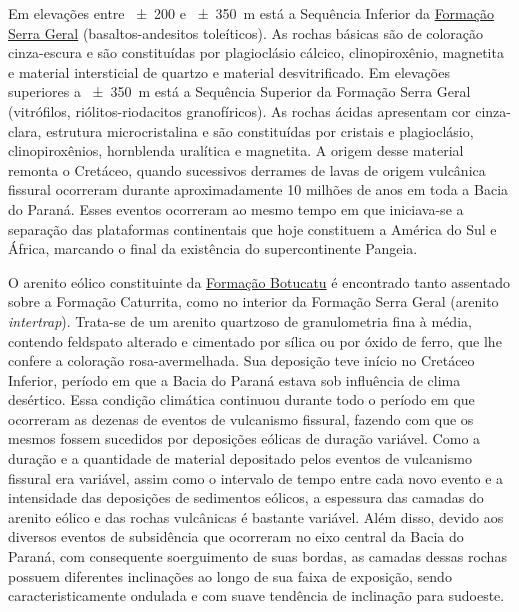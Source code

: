 \def\serrageral{\href{http://pt.wikipedia.org/wiki/Forma\%C3\%A7\%C3\%A3o_Serra_Geral}{Formação Serra Geral}}

Em elevações entre \num{\pm200} e \SI{\pm350}{\metre} está a Sequência Inferior da \serrageral{} 
(basaltos-andesitos toleíticos). As rochas básicas são de coloração cinza-escura e são constituídas por 
plagioclásio cálcico, clinopiroxênio, magnetita e material intersticial de quartzo e material desvitrificado. 
Em elevações superiores a \SI{\pm350}{\metre} está a Sequência Superior da Formação Serra Geral (vitrófilos, 
riólitos-riodacitos granofíricos). As rochas ácidas apresentam cor cinza-clara, estrutura microcristalina e 
são constituídas por cristais e plagioclásio, clinopiroxênios, hornblenda uralítica e magnetita. A origem 
desse material remonta o Cretáceo, quando sucessivos derrames de lavas de origem vulcânica fissural ocorreram 
durante aproximadamente \num{10} milhões de anos em toda a Bacia do Paraná. Esses eventos ocorreram ao mesmo 
tempo em que iniciava-se a separação das plataformas continentais que hoje constituem a América do Sul e 
África, 
marcando o final da existência do supercontinente Pangeia.

\def\botucatu{\href{http://pt.wikipedia.org/wiki/Forma\%C3\%A7\%C3\%A3o_Botucatu}{Formação Botucatu}}

O arenito eólico constituinte da \botucatu{} é encontrado tanto assentado sobre a Formação Caturrita, como no 
interior da Formação Serra Geral (arenito \emph{intertrap}). Trata-se de um arenito quartzoso de granulometria 
fina à média, contendo feldspato alterado e cimentado por sílica ou por óxido de ferro, que lhe confere a 
coloração rosa-avermelhada. Sua deposição teve início no Cretáceo Inferior, período em que a Bacia do Paraná 
estava sob influência de clima desértico. Essa condição climática continuou durante todo o período em que 
ocorreram as dezenas de eventos de vulcanismo fissural, fazendo com que os mesmos fossem sucedidos por 
deposições eólicas de duração variável. Como a duração e a quantidade de material depositado pelos eventos de 
vulcanismo fissural era variável, assim como o intervalo de tempo entre cada novo evento e a intensidade das 
deposições de sedimentos eólicos, a espessura das camadas do arenito eólico e das rochas vulcânicas é bastante 
variável. Além disso, devido aos diversos eventos de subsidência que ocorreram no eixo central da Bacia do 
Paraná, com consequente soerguimento de suas bordas, as camadas dessas rochas possuem diferentes inclinações 
ao longo de sua faixa de exposição, sendo caracteristicamente ondulada e com suave tendência de inclinação 
para sudoeste.

